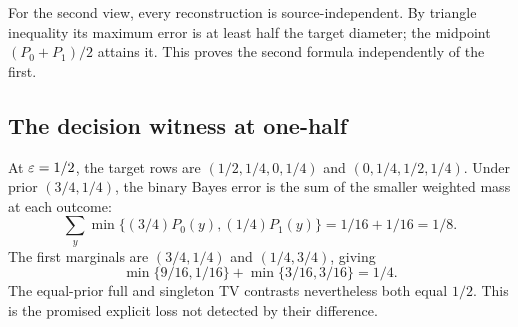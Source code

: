 For the second view, every reconstruction is source-independent. By triangle inequality its maximum error is at least half the target diameter; the midpoint \((P_0+P_1)/2\) attains it. This proves the second formula independently of the first.

\subsection{The decision witness at one-half}
At \(\varepsilon=1/2\), the target rows are \((1/2,1/4,0,1/4)\) and \((0,1/4,1/2,1/4)\). Under prior \((3/4,1/4)\), the binary Bayes error is the sum of the smaller weighted mass at each outcome:
\[
 \sum_y\min\{(3/4)P_0(y),(1/4)P_1(y)\}=1/16+1/16=1/8.
\]
The first marginals are \((3/4,1/4)\) and \((1/4,3/4)\), giving
\[
 \min\{9/16,1/16\}+\min\{3/16,3/16\}=1/4.
\]
The equal-prior full and singleton TV contrasts nevertheless both equal \(1/2\). This is the promised explicit loss not detected by their difference.


